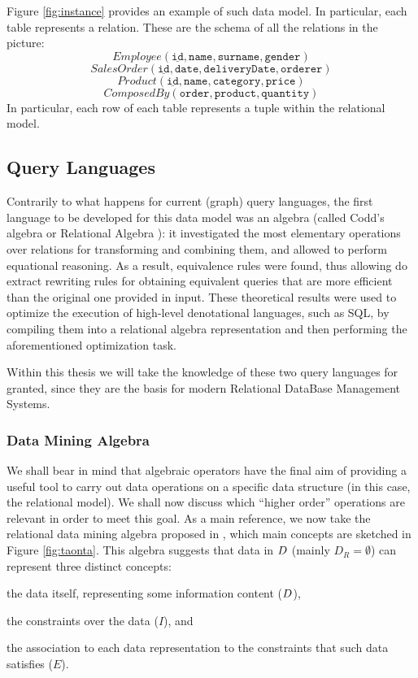 \begin{example}
Figure \ref{fig:instance} provides an example of such data model. In particular, each table represents a relation. These are the schema of all the relations in the picture:
\[Employee(\underline{\texttt{id}},\texttt{name},\texttt{surname},\texttt{gender})\]
\[SalesOrder(\underline{\texttt{id}},\texttt{date},\texttt{deliveryDate},\texttt{orderer})\]
\[Product(\underline{\texttt{id}},\texttt{name},\texttt{category},\texttt{price})\]
\[ComposedBy(\texttt{order},\texttt{product},\texttt{quantity})\]
In particular, each row of each table represents a tuple within the relational model. 
\end{example}

\subsection{Query Languages}
Contrarily to what happens for current (graph) query languages, the first language to be developed for this data model was an algebra (called Codd's algebra or Relational Algebra \cite{atzeni,atzeniIT,Elmasri}): it investigated the most elementary operations over relations for transforming and combining them, and allowed to perform equational reasoning. As a result, equivalence rules were found, thus allowing do extract rewriting rules for obtaining equivalent queries that are more efficient than the original one provided in input. These theoretical results were used to optimize the execution of high-level denotational languages, such as SQL, by compiling them into a relational algebra representation and then performing the aforementioned optimization task.

Within this thesis we will take the knowledge of these two query languages for granted, since they are the basis for modern Relational DataBase Management Systems. %

\subsubsection{Data Mining Algebra}\label{subsec:dmalgebra}
We shall bear in mind that algebraic operators have the final aim of providing a useful tool to carry out data operations on a specific data structure (in this case, the relational model).   We shall now discuss which ``higher order'' operations are relevant in order to meet this goal. As a main reference, we now take the relational data mining algebra proposed in \cite{Calders2006}, which main concepts are sketched in Figure \ref{fig:taonta}. This algebra suggests that data in $\data$ (mainly $D_R=\emptyset$) can represent three distinct concepts: \begin{mylist}
	\item the data itself, representing some information content ($\data$),
	\item the constraints over the data ($I$), and
	\item the association to each data representation to the constraints that such data satisfies ($E$).
\end{mylist}

